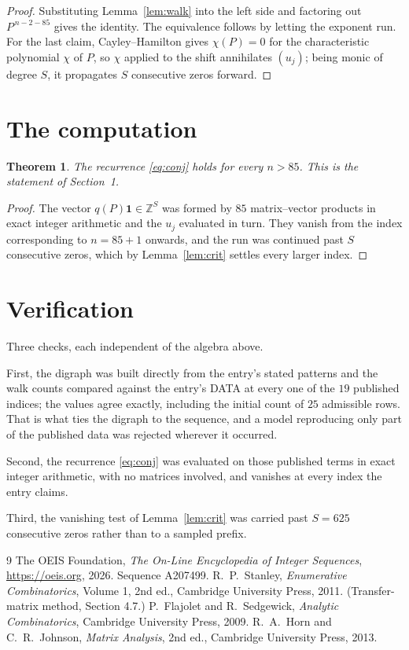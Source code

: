 \documentclass[11pt,a4paper]{article}
\theoremstyle{plain}
\newtheorem{theorem}{Theorem}
\theoremstyle{definition}
\begin{document}
\begin{proof}
Substituting Lemma~\ref{lem:walk} into the left side and factoring out
$P^{\,n-2-85}$ gives the identity. The equivalence follows by letting the exponent
run. For the last claim, Cayley--Hamilton gives $\chi(P)=0$ for the characteristic
polynomial $\chi$ of $P$, so $\chi$ applied to the shift annihilates $(u_j)$; being monic of
degree $S$, it propagates $S$ consecutive zeros forward.
\end{proof}

\section{The computation}

\begin{theorem}
The recurrence \eqref{eq:conj} holds for every $n>85$. This is the statement of
Section~1.
\end{theorem}

\begin{proof}
The vector $q(P)\mathbf{1}\in\mathbb{Z}^{S}$ was formed by $85$ matrix--vector
products in exact integer arithmetic and the $u_j$ evaluated in turn. They vanish from the
index corresponding to $n=85+1$ onwards, and the run was continued past $S$ consecutive
zeros, which by Lemma~\ref{lem:crit} settles every larger index.
\end{proof}

\section{Verification}

Three checks, each independent of the algebra above.

First, the digraph was built directly from the entry's stated patterns and the walk counts
compared against the entry's DATA at every one of the $19$ published indices; the
values agree exactly, including the initial count of $25$ admissible rows. That is
what ties the digraph to the sequence, and a model reproducing only part of the published
data was rejected wherever it occurred.

Second, the recurrence \eqref{eq:conj} was evaluated on those published terms in exact
integer arithmetic, with no matrices involved, and vanishes at every index the entry claims.

Third, the vanishing test of Lemma~\ref{lem:crit} was carried past $S=625$ consecutive
zeros rather than to a sampled prefix.

\begin{thebibliography}{9}
 The OEIS Foundation, \emph{The On-Line Encyclopedia of Integer
Sequences}, \url{https://oeis.org}, 2026. Sequence A207499.
 R.~P.~Stanley, \emph{Enumerative Combinatorics}, Volume 1, 2nd ed.,
Cambridge University Press, 2011. (Transfer-matrix method, Section 4.7.)
 P.~Flajolet and R.~Sedgewick, \emph{Analytic Combinatorics}, Cambridge
University Press, 2009.
 R.~A.~Horn and C.~R.~Johnson, \emph{Matrix Analysis}, 2nd ed., Cambridge
University Press, 2013.
\end{thebibliography}
\end{document}
